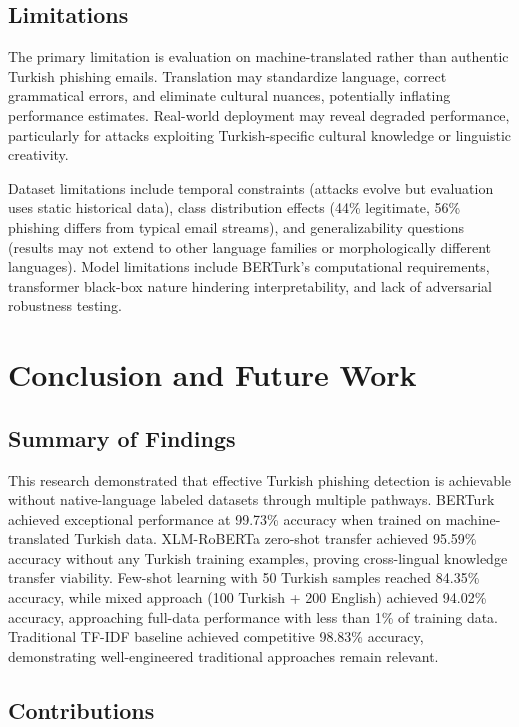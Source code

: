 \documentclass[conference]{IEEEtran}
\begin{document}
\subsection{Limitations}

The primary limitation is evaluation on machine-translated rather than authentic Turkish phishing emails. Translation may standardize language, correct grammatical errors, and eliminate cultural nuances, potentially inflating performance estimates. Real-world deployment may reveal degraded performance, particularly for attacks exploiting Turkish-specific cultural knowledge or linguistic creativity.

Dataset limitations include temporal constraints (attacks evolve but evaluation uses static historical data), class distribution effects (44\% legitimate, 56\% phishing differs from typical email streams), and generalizability questions (results may not extend to other language families or morphologically different languages). Model limitations include BERTurk's computational requirements, transformer black-box nature hindering interpretability, and lack of adversarial robustness testing.

\section{Conclusion and Future Work}

\subsection{Summary of Findings}

This research demonstrated that effective Turkish phishing detection is achievable without native-language labeled datasets through multiple pathways. BERTurk achieved exceptional performance at 99.73\% accuracy when trained on machine-translated Turkish data. XLM-RoBERTa zero-shot transfer achieved 95.59\% accuracy without any Turkish training examples, proving cross-lingual knowledge transfer viability. Few-shot learning with 50 Turkish samples reached 84.35\% accuracy, while mixed approach (100 Turkish + 200 English) achieved 94.02\% accuracy, approaching full-data performance with less than 1\% of training data. Traditional TF-IDF baseline achieved competitive 98.83\% accuracy, demonstrating well-engineered traditional approaches remain relevant.

\subsection{Contributions}
\end{document}
